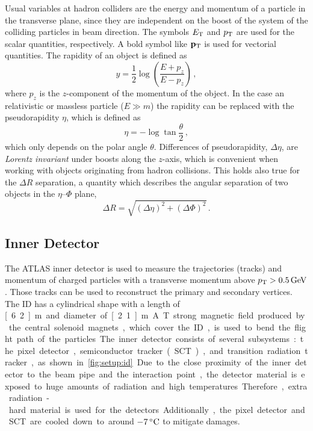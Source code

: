 Usual variables at hadron colliders are the energy and momentum of a particle in the transverse plane, since
they are independent on the boost of the system of the colliding particles in beam direction.
The symbols $E_\text{T}$ and $p_\text{T}$ are used for the scalar quantities, respectively.
A bold symbol like $\mathbf{p}_\text{T}$ is used for vectorial quantities.
The rapidity of an object is defined as
\begin{equation}
    \label{eq:rapidity}
    y = \frac{1}{2} \log \left( \frac{E + p_z}{E - p_z}\right) \,,
\end{equation}
where $p_z$ is the $z$-component of the momentum of the object.
In the case an relativistic or massless particle ($E \gg m$) the rapidity can be replaced with the pseudorapidity $\eta$,
which is defined as
\begin{equation}
    \label{eq:pseudorapidity}
    \eta = - \log \tan \frac{\theta}{2} \,,
\end{equation}
which only depends on the polar angle $\theta$.
Differences of pseudorapidity, $\Delta \eta$, are \emph{Lorentz invariant} under boosts along the $z$-axis,
which is convenient when working with objects originating from hadron collisions.
This holds also true for the $\Delta R$ separation, a quantity which describes the angular separation of two objects
in the $\eta$\nobreakdash--$\Phi$ plane,
\begin{equation}
    \label{eq:deltar}
    \Delta R = \sqrt{{\left(\Delta\eta\right)}^2 + {\left(\Delta \Phi\right)}^2} \,.
\end{equation}

\subsection{Inner Detector}\label{sub:setup:id}

The ATLAS inner detector is used to measure the trajectories (tracks) and momentum of charged particles with
a transverse momentum above $\pt > \unit[0.5]{GeV}$.
Those tracks can be used to reconstruct the primary and secondary vertices.
The ID has a cylindrical shape with a length of \unit[6.2]{m} and diameter of \unit[2.1]{m}.
A \unit[2]{T} strong magnetic field produced by the central solenoid magnets, which cover the ID, is used to bend the flight path of the particles.
The inner detector consists of several subsystems: the pixel detector, semiconductor tracker (SCT), and transition
radiation tracker, as shown in \cref{fig:setup:id}.
Due to the close proximity of the inner detector to the beam pipe and the interaction point, the detector material
is exposed to huge amounts of radiation and high temperatures.
Therefore, extra radiation-hard material is used for the detectors.
Additionally, the pixel detector and SCT are cooled down to around $\unit[-7]{{}^\circ C}$ to mitigate damages.

